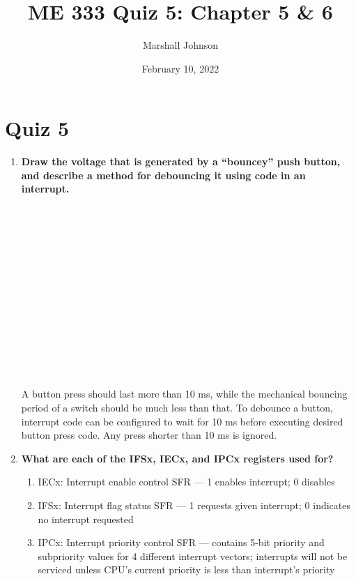 \documentclass{article}
\title{ME 333 Quiz 5: Chapter 5 \& 6}
\author{Marshall Johnson}
\date{February 10, 2022}
\begin{document}
\maketitle

\section*{Quiz 5}

\begin{enumerate}[label=\textbf{\arabic*})]
    \item \textbf{Draw the voltage that is generated by a “bouncey” push button, and describe a method for 
    debouncing it using code in an interrupt.} \\
    \\
    \\
    \\
    \\
    \\
    \\
    \\
    \\
    \\
    \\
    \\
    \\
    \\
    \\
    A button press should last more than 10 ms, while the mechanical bouncing period of a switch should be much 
    less than that. To debounce a button, interrupt code can be configured to wait for 10 ms before executing
    desired button press code. Any press shorter than 10 ms is ignored.

    \item \textbf{What are each of the IFSx, IECx, and IPCx registers used for?} \\
    \begin{enumerate}
        \item IECx: Interrupt enable control SFR --- 1 enables interrupt; 0 disables
        \item IFSx: Interrupt flag status SFR --- 1 requests given interrupt;
        0 indicates no interrupt requested 
        \item IPCx: Interrupt priority control SFR --- contains 5-bit priority
        and subpriority values for 4 different interrupt vectors; interrupts will
        not be serviced unless CPU's current priority is less than interrupt's 
        priority
    \end{enumerate}


\end{enumerate}
\end{document}
